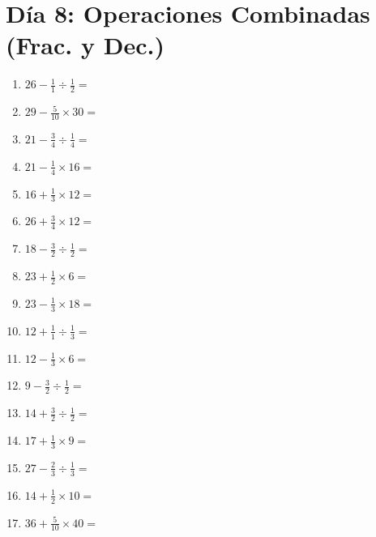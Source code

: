 \documentclass[12pt]{article}
\begin{document}
\section*{Día 8: Operaciones Combinadas (Frac. y Dec.)}
\begin{enumerate}
\item \large $ 26 - \frac{1}{1} \div \frac{1}{2} = $ \vspace{1.6cm}
\item \large $ 29 - \frac{5}{10} \times 30 = $ \vspace{1.6cm}
\item \large $ 21 - \frac{3}{4} \div \frac{1}{4} = $ \vspace{1.6cm}
\item \large $ 21 - \frac{1}{4} \times 16 = $ \vspace{1.6cm}
\item \large $ 16 + \frac{1}{3} \times 12 = $ \vspace{1.6cm}
\item \large $ 26 + \frac{3}{4} \times 12 = $ \vspace{1.6cm}
\item \large $ 18 - \frac{3}{2} \div \frac{1}{2} = $ \vspace{1.6cm}
\item \large $ 23 + \frac{1}{2} \times 6 = $ \vspace{1.6cm}
\item \large $ 23 - \frac{1}{3} \times 18 = $ \vspace{1.6cm}
\item \large $ 12 + \frac{1}{1} \div \frac{1}{3} = $ \vspace{1.6cm}
\newpage
\item \large $ 12 - \frac{1}{3} \times 6 = $ \vspace{1.6cm}
\item \large $ 9 - \frac{3}{2} \div \frac{1}{2} = $ \vspace{1.6cm}
\item \large $ 14 + \frac{3}{2} \div \frac{1}{2} = $ \vspace{1.6cm}
\item \large $ 17 + \frac{1}{3} \times 9 = $ \vspace{1.6cm}
\item \large $ 27 - \frac{2}{3} \div \frac{1}{3} = $ \vspace{1.6cm}
\item \large $ 14 + \frac{1}{2} \times 10 = $ \vspace{1.6cm}
\item \large $ 36 + \frac{5}{10} \times 40 = $ \vspace{1.6cm}

\end{enumerate}
\end{document}
